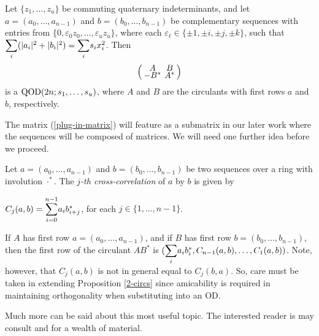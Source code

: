 \documentclass[../../../main]{subfiles}
\begin{document}
 \begin{prop}\label{2-circs}
  Let $\{z_1,\dots,z_u\}$ be commuting quaternary indeterminants, and let
  $a=(a_0,\dots,a_{n-1})$ and $b=(b_0,\dots,b_{n-1})$ be complementary sequences
  with entries from $\{0,\varepsilon_0z_0, \dots, \varepsilon_uz_u\}$, where each $\varepsilon_\ell \in \{\pm 1, \pm i, \pm j, \pm k\}$, such that $\ssum_i(|a_i|^2 + |b_i|^2)=\ssum_is_ix_i^2$. Then
  \begin{equation}\label{plug-in-matrix}
  \arraycolsep=2.0pt\def\arraystretch{0.5}
   \left(\begin{array}{cc}
    A&B\\-B^*&A^*
   \end{array}\right)
  \end{equation}
  is a $\text{QOD}(2n;s_1,\dots,s_u)$, where $A$ and $B$ are the circulants with first rows $a$ and $b$, respectively.
 \end{prop}

 The matrix (\ref{plug-in-matrix}) will feature as a submatrix in our later work where the sequences will be composed of matrices. We will need one further idea before we proceed. 

 \begin{defin}
  Let $a=(a_0,\dots,a_{n-1})$ and $b=(b_0,\dots,b_{n-1})$ be two sequences over a ring with involution $\cdot^*$. The {\it $j$-th cross-correlation} of $a$ by $b$ is given by
  \begin{defenum}
   \item $C_j(a,b)=\ssum_{i=0}^{n-1}a_ib_{i+j}^*$, for each $j \in \{1,\dots,n-1\}$.
  \end{defenum}
 \end{defin}
 
 If $A$ has first row $a=(a_0,\dots,a_{n-1})$, and if $B$ has first row $b=(b_0,\dots,b_{n-1})$, then the first row of the circulant $AB^*$ is $(\ssum_ia_ib_i^*,C_{n-1}(a,b),\dots,C_1(a,b))$. Note, however, that $C_j(a,b)$ is not in general equal to $C_j(b,a)$. So, care must be taken in extending Proposition \ref{2-circs} since amicability is required in maintaining orthogonality when substituting into an OD.
 
 Much more can be said about this most useful topic. The interested reader is may consult \cite{seberry-od-2017} and \cite{seberry-yamada-hmatrices-designs} for a wealth of material.

  \biblio
\end{document}
